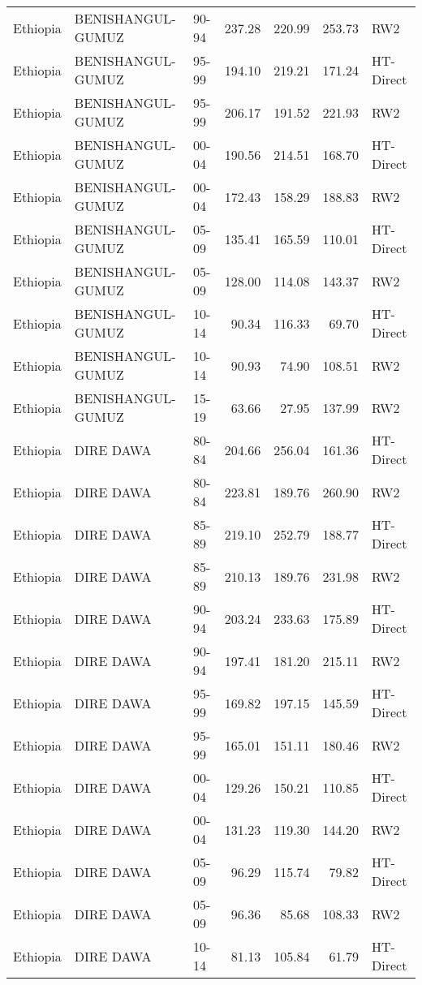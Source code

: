\begin{longtable}{lllrrrl}
  Ethiopia & BENISHANGUL-GUMUZ & 90-94 & 237.28 & 220.99 & 253.73 & RW2 \\ 
  Ethiopia & BENISHANGUL-GUMUZ & 95-99 & 194.10 & 219.21 & 171.24 & HT-Direct \\ 
  Ethiopia & BENISHANGUL-GUMUZ & 95-99 & 206.17 & 191.52 & 221.93 & RW2 \\ 
  Ethiopia & BENISHANGUL-GUMUZ & 00-04 & 190.56 & 214.51 & 168.70 & HT-Direct \\ 
  Ethiopia & BENISHANGUL-GUMUZ & 00-04 & 172.43 & 158.29 & 188.83 & RW2 \\ 
  Ethiopia & BENISHANGUL-GUMUZ & 05-09 & 135.41 & 165.59 & 110.01 & HT-Direct \\ 
  Ethiopia & BENISHANGUL-GUMUZ & 05-09 & 128.00 & 114.08 & 143.37 & RW2 \\ 
  Ethiopia & BENISHANGUL-GUMUZ & 10-14 & 90.34 & 116.33 & 69.70 & HT-Direct \\ 
  Ethiopia & BENISHANGUL-GUMUZ & 10-14 & 90.93 & 74.90 & 108.51 & RW2 \\ 
  Ethiopia & BENISHANGUL-GUMUZ & 15-19 & 63.66 & 27.95 & 137.99 & RW2 \\ 
  Ethiopia & DIRE DAWA & 80-84 & 204.66 & 256.04 & 161.36 & HT-Direct \\ 
  Ethiopia & DIRE DAWA & 80-84 & 223.81 & 189.76 & 260.90 & RW2 \\ 
  Ethiopia & DIRE DAWA & 85-89 & 219.10 & 252.79 & 188.77 & HT-Direct \\ 
  Ethiopia & DIRE DAWA & 85-89 & 210.13 & 189.76 & 231.98 & RW2 \\ 
  Ethiopia & DIRE DAWA & 90-94 & 203.24 & 233.63 & 175.89 & HT-Direct \\ 
  Ethiopia & DIRE DAWA & 90-94 & 197.41 & 181.20 & 215.11 & RW2 \\ 
  Ethiopia & DIRE DAWA & 95-99 & 169.82 & 197.15 & 145.59 & HT-Direct \\ 
  Ethiopia & DIRE DAWA & 95-99 & 165.01 & 151.11 & 180.46 & RW2 \\ 
  Ethiopia & DIRE DAWA & 00-04 & 129.26 & 150.21 & 110.85 & HT-Direct \\ 
  Ethiopia & DIRE DAWA & 00-04 & 131.23 & 119.30 & 144.20 & RW2 \\ 
  Ethiopia & DIRE DAWA & 05-09 & 96.29 & 115.74 & 79.82 & HT-Direct \\ 
  Ethiopia & DIRE DAWA & 05-09 & 96.36 & 85.68 & 108.33 & RW2 \\ 
  Ethiopia & DIRE DAWA & 10-14 & 81.13 & 105.84 & 61.79 & HT-Direct \\ 

\end{longtable}

